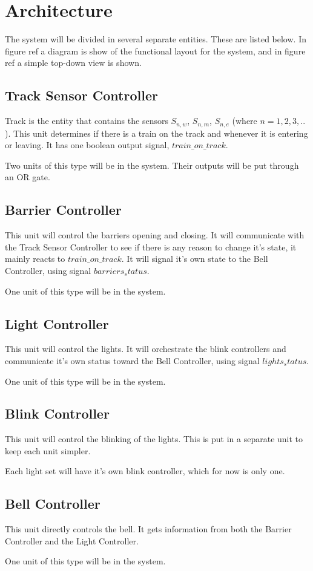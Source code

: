 \documentclass[final]{report}
\begin{document}
\chapter{Architecture}
The system will be divided in several separate entities.
These are listed below.
In figure ref{} a diagram is show of the functional layout for the system, and in figure ref{} a simple top-down view is shown.

\section{Track Sensor Controller}
Track is the entity that contains the sensors $S_{n,w}$, $S_{n,m}$, $S_{n,e}$ (where $n = 1,2,3,..$).
This unit determines if there is a train on the track and whenever it is entering or leaving.
It has one boolean output signal, $train\_on\_track$.

Two units of this type will be in the system.
Their outputs will be put through an OR gate.
\section{Barrier Controller}
This unit will control the barriers opening and closing.
It will communicate with the Track Sensor Controller to see if there is any reason to change it's state, it mainly reacts to $train\_on\_track$.
It will signal it's own state to the Bell Controller, using signal $barriers_status$.

One unit of this type will be in the system.
\section{Light Controller}
This unit will control the lights.
It will orchestrate the blink controllers and communicate it's own status toward the Bell Controller, using signal $lights_status$.

One unit of this type will be in the system.
\section{Blink Controller}
This unit will control the blinking of the lights.
This is put in a separate unit to keep each unit simpler.

Each light set will have it's own blink controller, which for now is only one.
\section{Bell Controller}
This unit directly controls the bell.
It gets information from both the Barrier Controller and the Light Controller.

One unit of this type will be in the system.
\end{document}

